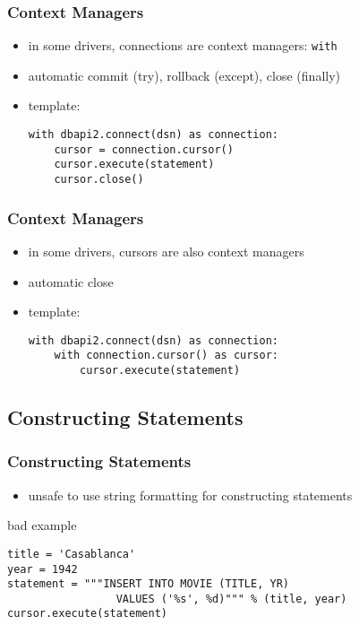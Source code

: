 \documentclass[dvipsnames]{beamer}
\theoremstyle{plain}
\begin{document}
\begin{frame}[fragile]
  \frametitle{Context Managers}

  \begin{itemize}
    \item in some drivers, connections are context managers: \lstinline!with!
    \item automatic commit (try), rollback (except), close (finally)

    \medskip
    \item template:
    \begin{lstlisting}
with dbapi2.connect(dsn) as connection:
    cursor = connection.cursor()
    cursor.execute(statement)
    cursor.close()
    \end{lstlisting}
  \end{itemize}
\end{frame}

\begin{frame}[fragile]
  \frametitle{Context Managers}

  \begin{itemize}
    \item in some drivers, cursors are also context managers
    \item automatic close

    \medskip
    \item template:
    \begin{lstlisting}
with dbapi2.connect(dsn) as connection:
    with connection.cursor() as cursor:
        cursor.execute(statement)
    \end{lstlisting}
  \end{itemize}
\end{frame}

\subsection{Constructing Statements}

\begin{frame}[fragile]
  \frametitle{Constructing Statements}

  \begin{itemize}
    \item unsafe to use string formatting for constructing statements
  \end{itemize}

  \medskip
  \begin{exampleblock}{bad example}
    \begin{lstlisting}
title = 'Casablanca'
year = 1942
statement = """INSERT INTO MOVIE (TITLE, YR)
                 VALUES ('%s', %d)""" % (title, year)
cursor.execute(statement)
    \end{lstlisting}
  \end{exampleblock}
\end{frame}
\end{document}
